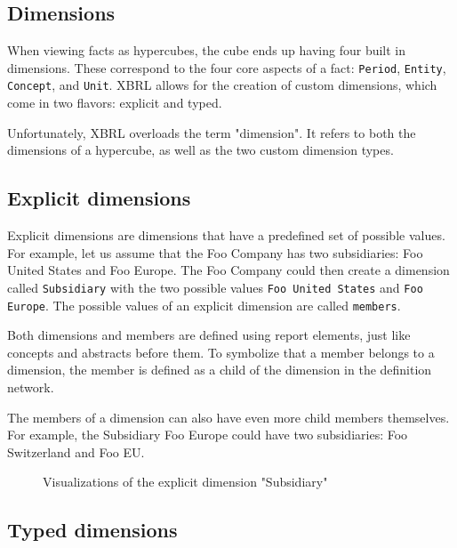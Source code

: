 \subsection{Dimensions}

When viewing facts as hypercubes, the cube ends up having four built in dimensions.
These correspond to the four core aspects of a fact: \texttt{Period}, \texttt{Entity}, \texttt{Concept}, and \texttt{Unit}.
XBRL allows for the creation of custom dimensions, which come in two flavors: explicit and typed.

Unfortunately, XBRL overloads the term "dimension".
It refers to both the dimensions of a hypercube, as well as the two custom dimension types. 

\subsection{Explicit dimensions}

Explicit dimensions are dimensions that have a predefined set of possible values.
For example, let us assume that the Foo Company has two subsidiaries: Foo United States and Foo Europe.
The Foo Company could then create a dimension called \texttt{Subsidiary} with the two possible values \texttt{Foo United States} and \texttt{Foo Europe}.
The possible values of an explicit dimension are called \texttt{members}.

Both dimensions and members are defined using report elements, just like concepts and abstracts before them.
To symbolize that a member belongs to a dimension, the member is defined as a child of the dimension in the definition network.

The members of a dimension can also have even more child members themselves.
For example, the Subsidiary Foo Europe could have two subsidiaries: Foo Switzerland and Foo EU.

\begin{figure}[H]
    \label{fig:example_explicit_dimension}
    \caption{Visualizations of the explicit dimension "Subsidiary"}
\end{figure}

\subsection{Typed dimensions}

